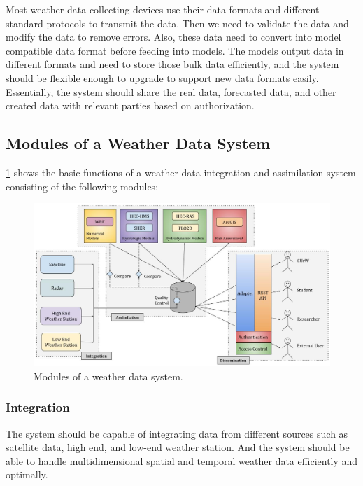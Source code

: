 Most weather data collecting devices use their data formats and different standard protocols to transmit the data. Then we need to validate the data and modify the data to remove errors. Also, these data need to convert into model compatible data format before feeding into models. The models output data in different formats and need to store those bulk data efficiently, and the system should be flexible enough to upgrade to support new data formats easily. Essentially, the system should share the real data, forecasted data, and other created data with relevant parties based on authorization.


\subsection{Modules of a Weather Data System}
\label{subse:modules_weather_data_integration_sys}

\cref{fi:wdia_components} shows the basic functions of a weather data integration and assimilation system consisting of the following modules: 

\begin{figure}[htbp]
\centerline{\includegraphics[width=1\textwidth]{method/misc/weather_data_system_components.jpg}}
\caption{Modules of a weather data system.}
\label{fi:wdia_components}
\end{figure}

\subsubsection{Integration }
The system should be capable of integrating data from different sources such as satellite data, high end, and low-end weather station. And the system should be able to handle multidimensional spatial and temporal weather data efficiently and optimally.
